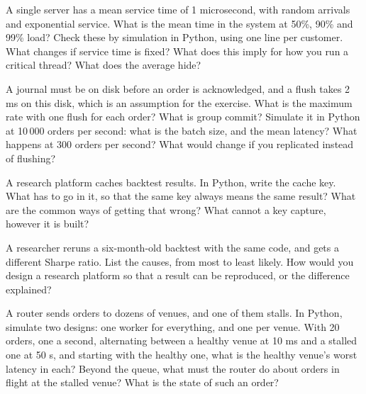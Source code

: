 \begin{question}\label{iq:iv3:system-design:25}
A single server has a mean service time of 1 microsecond, with random arrivals and exponential service. What is the mean time in the system at 50\%, 90\% and 99\% load? Check these by simulation in Python, using one line per customer. What changes if service time is fixed? What does this imply for how you run a critical thread? What does the average hide?
\end{question}

\begin{question}\label{iq:iv3:system-design:26}
A journal must be on disk before an order is acknowledged, and a flush takes 2 ms on this disk, which is an assumption for the exercise. What is the maximum rate with one flush for each order? What is group commit? Simulate it in Python at 10\,000 orders per second: what is the batch size, and the mean latency? What happens at 300 orders per second? What would change if you replicated instead of flushing?
\end{question}

\begin{question}\label{iq:iv3:system-design:27}
A research platform caches backtest results. In Python, write the cache key. What has to go in it, so that the same key always means the same result? What are the common ways of getting that wrong? What cannot a key capture, however it is built?
\end{question}

\begin{question}\label{iq:iv3:system-design:28}
A researcher reruns a six-month-old backtest with the same code, and gets a different Sharpe ratio. List the causes, from most to least likely. How would you design a research platform so that a result can be reproduced, or the difference explained?
\end{question}

\begin{question}\label{iq:iv3:system-design:29}
A router sends orders to dozens of venues, and one of them stalls. In Python, simulate two designs: one worker for everything, and one per venue. With 20 orders, one a second, alternating between a healthy venue at 10 ms and a stalled one at 50 s, and starting with the healthy one, what is the healthy venue's worst latency in each? Beyond the queue, what must the router do about orders in flight at the stalled venue? What is the state of such an order?
\end{question}

